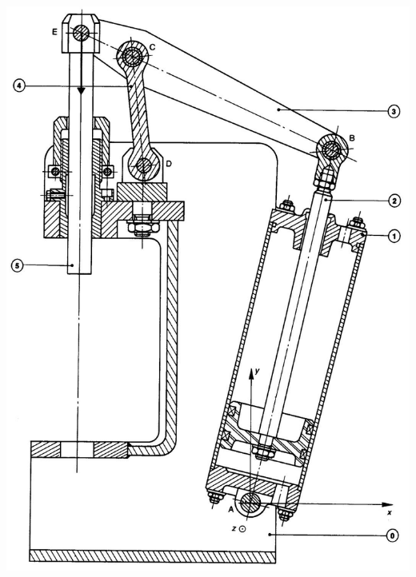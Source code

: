 \documentclass[11pt,oneside]{article}
\begin{document}
\newpage
$$
\quad
$$

\begin{center}
\includegraphics[width=.8\textwidth]{png/fig2}
\end{center}
\end{document}
